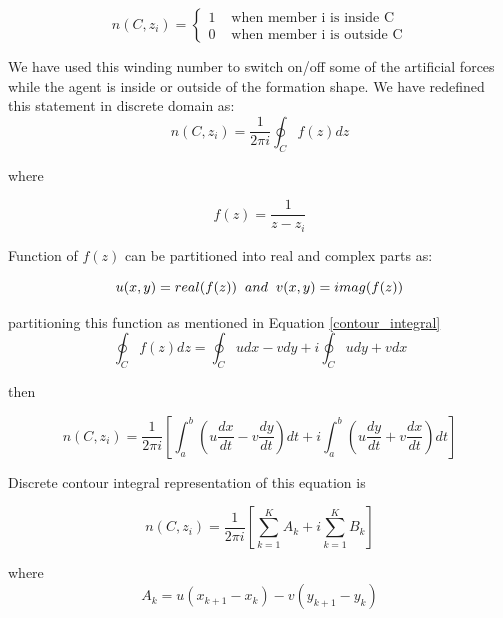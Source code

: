 \begin{equation}
n(C,z_i) = \left\{ \begin{array}{rl}
1 &\mbox{ when member i is inside C} \\
0 &\mbox{ when member i is outside C}
\end{array} \right.
\end{equation}

We have used this winding number to switch on/off some of the artificial forces while the agent is inside or outside of the formation shape. We have redefined this statement in discrete domain as:
\begin{equation}
n(C,z_i) = \frac{1}{2\pi i} \oint_C f(z)dz
\end{equation}

where 

\begin{equation}
f(z) = \frac{1}{z-z_i}
\end{equation}
		
Function of $f(z)$ can be partitioned into real and complex parts as:

\begin{equation}
u(x,y) = real(f(z))  \hspace{0.2cm} and \hspace{0.2cm} v(x,y) = imag(f(z))
\end{equation}
		
partitioning this function as mentioned in Equation \ref{contour_integral}
\begin{equation}
\oint_C f(z)dz  = \oint_C u dx - v dy + i \oint_C u dy + v dx 
\end{equation}

then

\begin{equation}
n(C,z_i)  = \frac{1}{2\pi i} \left[\int_{a}^{b} \left(u\frac{dx}{dt} - v\frac{dy}{dt}\right)dt + i\int_{a}^{b}\left(u\frac{dy}{dt} + v\frac{dx}{dt}\right)dt\right]
\end{equation}
		
Discrete contour integral representation of this equation is
		
\begin{equation}
n(C,z_i)  = \frac{1}{2\pi i} {\left[\sum_{k=1}^{K} {A_k} + i\sum_{k=1}^{K} {B_k}\right]}
\end{equation}

where
\begin{equation}
A_k = u(x_{k+1} - x_k ) - v(y_{k+1} -y_k )
\end{equation}


